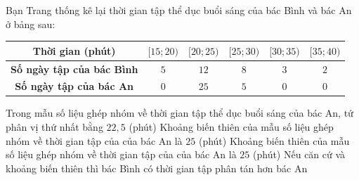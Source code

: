 \begin{ex}%
Bạn Trang thống kê lại thời gian tập thể dục buổi sáng của bác Bình và bác An ở bảng sau:
\begin{center}
\begin{tabular}{|c|c|c|c|c|c|}
\hline
\textbf{Thời gian (phút)} & $[15;20)$ & $[20;25)$ & $[25;30)$ & $[30;35)$ & $[35;40)$\\
\hline
\textbf{Số ngày tập của bác Bình} & $5$ & $12$ & $8$ & $3$ & $2$ \\
\hline
\textbf{Số ngày tập của bác An} & $0$ & $25$ & $5$ & $0$ & $0$\\
\hline
\end{tabular}
\end{center}
\choiceTF
{Trong mẫu số liệu ghép nhóm về thời gian tập thể dục buổi sáng của bác An, tứ phân vị thứ nhất bằng $22{,}5$ (phút)}
{\True Khoảng biến thiên của mẫu số liệu ghép nhóm về thời gian tập của của bác An là $25$ (phút)}
{Khoảng biến thiên của mẫu số liệu ghép nhóm về thời gian tập của của bác An là $25$ (phút)}
{\True Nếu căn cứ và khoảng biến thiên thì bác Bình có thời gian tập phân tán hơn bác An}
\end{ex}

